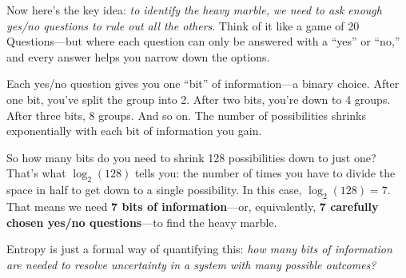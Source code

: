 Now here’s the key idea: \textit{to identify the heavy marble, we need to ask enough yes/no questions to rule out all the others}. Think of it like a game of 20 Questions—but where each question can only be answered with a “yes” or “no,” and every answer helps you narrow down the options.

Each yes/no question gives you one “bit” of information—a binary choice. After one bit, you’ve split the group into 2. After two bits, you’re down to 4 groups. After three bits, 8 groups. And so on. The number of possibilities shrinks exponentially with each bit of information you gain.

So how many bits do you need to shrink 128 possibilities down to just one? That’s what \( \log_2(128) \) tells you: the number of times you have to divide the space in half to get down to a single possibility. In this case, \( \log_2(128) = 7 \). That means we need \textbf{7 bits of information}—or, equivalently, \textbf{7 carefully chosen yes/no questions}—to find the heavy marble.

Entropy is just a formal way of quantifying this: \textit{how many bits of information are needed to resolve uncertainty in a system with many possible outcomes?}


\begin{center}
\end{center}






